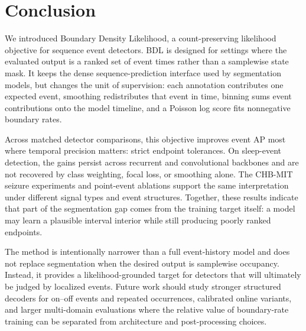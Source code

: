 \section{Conclusion}

We introduced Boundary Density Likelihood, a count-preserving likelihood objective for sequence event detectors.
BDL is designed for settings where the evaluated output is a ranked set of event times rather than a samplewise state mask.
It keeps the dense sequence-prediction interface used by segmentation models, but changes the unit of supervision: each annotation contributes one expected event, smoothing redistributes that event in time, binning sums event contributions onto the model timeline, and a Poisson log score fits nonnegative boundary rates.

Across matched detector comparisons, this objective improves event AP most where temporal precision matters: strict endpoint tolerances.
On sleep-event detection, the gains persist across recurrent and convolutional backbones and are not recovered by class weighting, focal loss, or smoothing alone.
The CHB-MIT seizure experiments and point-event ablations support the same interpretation under different signal types and event structures.
Together, these results indicate that part of the segmentation gap comes from the training target itself: a model may learn a plausible interval interior while still producing poorly ranked endpoints.

The method is intentionally narrower than a full event-history model and does not replace segmentation when the desired output is samplewise occupancy.
Instead, it provides a likelihood-grounded target for detectors that will ultimately be judged by localized events.
Future work should study stronger structured decoders for on--off events and repeated occurrences, calibrated online variants, and larger multi-domain evaluations where the relative value of boundary-rate training can be separated from architecture and post-processing choices.
